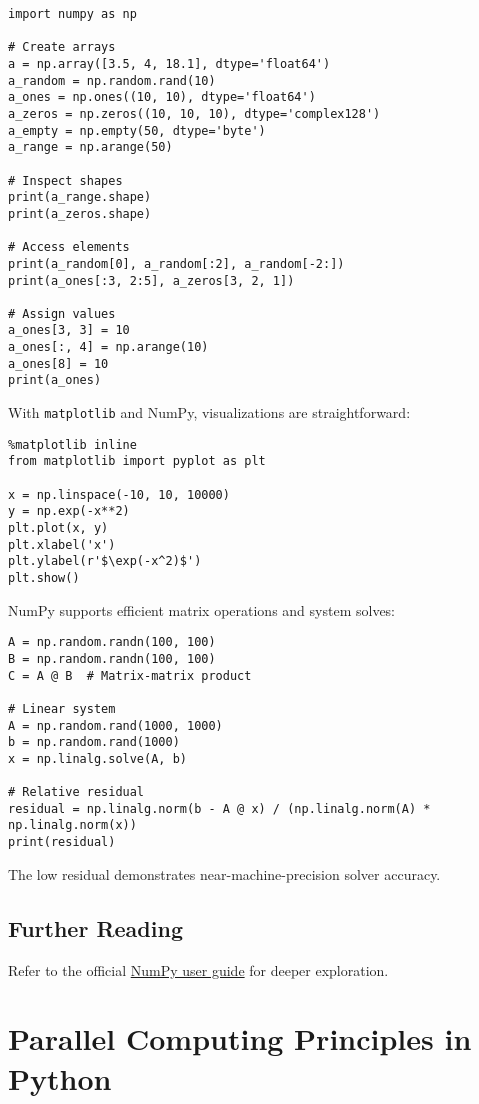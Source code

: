 \documentclass{book}
\begin{document}
\begin{lstlisting}
import numpy as np

# Create arrays
a = np.array([3.5, 4, 18.1], dtype='float64')
a_random = np.random.rand(10)
a_ones = np.ones((10, 10), dtype='float64')
a_zeros = np.zeros((10, 10, 10), dtype='complex128')
a_empty = np.empty(50, dtype='byte')
a_range = np.arange(50)

# Inspect shapes
print(a_range.shape)
print(a_zeros.shape)

# Access elements
print(a_random[0], a_random[:2], a_random[-2:])
print(a_ones[:3, 2:5], a_zeros[3, 2, 1])

# Assign values
a_ones[3, 3] = 10
a_ones[:, 4] = np.arange(10)
a_ones[8] = 10
print(a_ones)
\end{lstlisting}

With \texttt{matplotlib} and NumPy, visualizations are straightforward:

\begin{lstlisting}
%matplotlib inline
from matplotlib import pyplot as plt

x = np.linspace(-10, 10, 10000)
y = np.exp(-x**2)
plt.plot(x, y)
plt.xlabel('x')
plt.ylabel(r'$\exp(-x^2)$')
plt.show()
\end{lstlisting}

NumPy supports efficient matrix operations and system solves:

\begin{lstlisting}
A = np.random.randn(100, 100)
B = np.random.randn(100, 100)
C = A @ B  # Matrix-matrix product

# Linear system
A = np.random.rand(1000, 1000)
b = np.random.rand(1000)
x = np.linalg.solve(A, b)

# Relative residual
residual = np.linalg.norm(b - A @ x) / (np.linalg.norm(A) * np.linalg.norm(x))
print(residual)
\end{lstlisting}

The low residual demonstrates near-machine-precision solver accuracy.

\section*{Further Reading}
Refer to the official \href{https://numpy.org/user/}{NumPy user guide} for deeper exploration.

\chapter{Parallel Computing Principles in Python}
\end{document}
